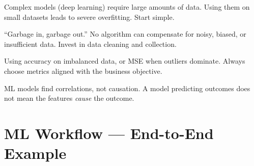 \documentclass[11pt,a4paper]{article}
\begin{document}
\begin{alertbox}
Complex models (deep learning) require large amounts of data. Using them on small datasets leads to severe overfitting. Start simple.
\end{alertbox}

\begin{alertbox}
``Garbage in, garbage out.'' No algorithm can compensate for noisy, biased, or insufficient data. Invest in data cleaning and collection.
\end{alertbox}

\begin{alertbox}
Using accuracy on imbalanced data, or MSE when outliers dominate. Always choose metrics aligned with the business objective.
\end{alertbox}

\begin{alertbox}
ML models find correlations, not causation. A model predicting outcomes does not mean the features \emph{cause} the outcome.
\end{alertbox}

\section{ML Workflow --- End-to-End Example}
\end{document}
